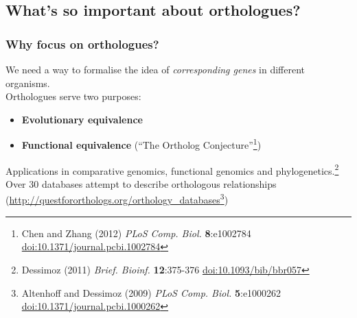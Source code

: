 
\subsection{What's so important about orthologues?}

\begin{frame}
  \frametitle{Why focus on orthologues?}
  We need a way to formalise the idea of \textit{corresponding genes} in different organisms. \\
  Orthologues serve two purposes:
  \begin{itemize}
    \item \textbf{Evolutionary equivalence}
    \item \textbf{Functional equivalence} (``The Ortholog Conjecture''\footnote{\tiny{Chen and Zhang (2012) \textit{PLoS Comp. Biol.} \textbf{8}:e1002784 \href{http://dx.doi.org/10.1371/journal.pcbi.1002784}{doi:10.1371/journal.pcbi.1002784}}})
  \end{itemize}
  Applications in comparative genomics, functional genomics and phylogenetics.\footnote{\tiny{Dessimoz (2011) \textit{Brief. Bioinf.} \textbf{12}:375-376 \href{http://dx.doi.org/10.1093/bib/bbr057}{doi:10.1093/bib/bbr057}}} \\
  Over 30 databases attempt to describe orthologous relationships (\href{http://questfororthologs.org/orthology_databases
}{http://questfororthologs.org/orthology\_databases}\footnote{\tiny{Altenhoff and Dessimoz (2009) \textit{PLoS Comp. Biol.} \textbf{5}:e1000262 \href{http://dx.doi.org/10.1371/journal.pcbi.1000262}{doi:10.1371/journal.pcbi.1000262}}})
\end{frame}


